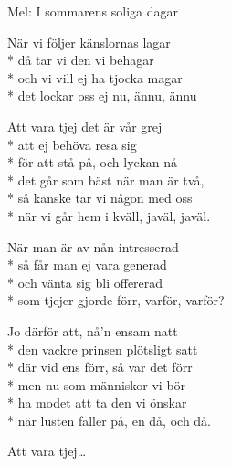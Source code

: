 \begin{SongText}
    \begin{SongInfo}
        Mel: I sommarens soliga dagar
    \end{SongInfo}
    \begin{SongVerse}
        När vi följer känslornas lagar\\*%
        då tar vi den vi behagar\\*%
        och vi vill ej ha tjocka magar\\*%
        det lockar oss ej nu, ännu, ännu
    \end{SongVerse}
    \begin{SongVerse}
        Att vara tjej det är vår grej\\*%
        att ej behöva resa sig\\*%
        för att stå på, och lyckan nå\\*%
        det går som bäst när man är två,\\*%
        så kanske tar vi någon med oss\\*%
        när vi går hem i kväll, javäl, javäl.
    \end{SongVerse}
    \begin{SongVerse}
        När man är av nån intresserad\\*%
        så får man ej vara generad\\*%
        och vänta sig bli offererad\\*%
        som tjejer gjorde förr, varför, varför?
    \end{SongVerse}
    \begin{SongVerse}
        Jo därför att, nå’n ensam natt\\*%
        den vackre prinsen plötsligt satt\\*%
        där vid ens förr, så var det förr\\*%
        men nu som människor vi bör\\*%
        ha modet att ta den vi önskar\\*%
        när lusten faller på, en då, och då.
    \end{SongVerse}
    \begin{SongVerse}
        Att vara tjej…
    \end{SongVerse}
\end{SongText}